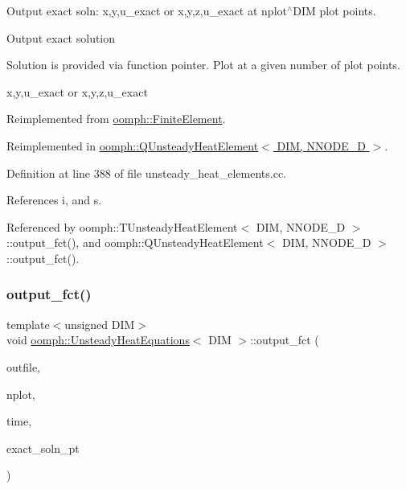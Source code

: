 Output exact soln\+: x,y,u\+\_\+exact or x,y,z,u\+\_\+exact at nplot$^\wedge$\+D\+IM plot points. 

Output exact solution

Solution is provided via function pointer. Plot at a given number of plot points.

x,y,u\+\_\+exact or x,y,z,u\+\_\+exact 

Reimplemented from \hyperlink{classoomph_1_1FiniteElement_a22b695c714f60ee6cd145be348042035}{oomph\+::\+Finite\+Element}.



Reimplemented in \hyperlink{classoomph_1_1QUnsteadyHeatElement_a4a9b9735828f0e11fd439944e2332781}{oomph\+::\+Q\+Unsteady\+Heat\+Element$<$ D\+I\+M, N\+N\+O\+D\+E\+\_\+D $>$}.



Definition at line 388 of file unsteady\+\_\+heat\+\_\+elements.\+cc.



References i, and s.



Referenced by oomph\+::\+T\+Unsteady\+Heat\+Element$<$ D\+I\+M, N\+N\+O\+D\+E\+\_\+D $>$\+::output\+\_\+fct(), and oomph\+::\+Q\+Unsteady\+Heat\+Element$<$ D\+I\+M, N\+N\+O\+D\+E\+\_\+D $>$\+::output\+\_\+fct().

\mbox{\label{classoomph_1_1UnsteadyHeatEquations_ab6f0a3d6afeec2fc0395f6185d91e588}} 
\subsubsection{\texorpdfstring{output\+\_\+fct()}{output\_fct()}\hspace{0.1cm}{\footnotesize\ttfamily [2/2]}}
{\footnotesize\ttfamily template$<$unsigned D\+IM$>$ \\
void \hyperlink{classoomph_1_1UnsteadyHeatEquations}{oomph\+::\+Unsteady\+Heat\+Equations}$<$ D\+IM $>$\+::output\+\_\+fct (\begin{DoxyParamCaption}\item[{std\+::ostream \&}]{outfile,  }\item[{const unsigned \&}]{nplot,  }\item[{const double \&}]{time,  }\item[{\hyperlink{classoomph_1_1FiniteElement_ad4ecf2b61b158a4b4d351a60d23c633e}{Finite\+Element\+::\+Unsteady\+Exact\+Solution\+Fct\+Pt}}]{exact\+\_\+soln\+\_\+pt }\end{DoxyParamCaption})\hspace{0.3cm}{\ttfamily [virtual]}}



